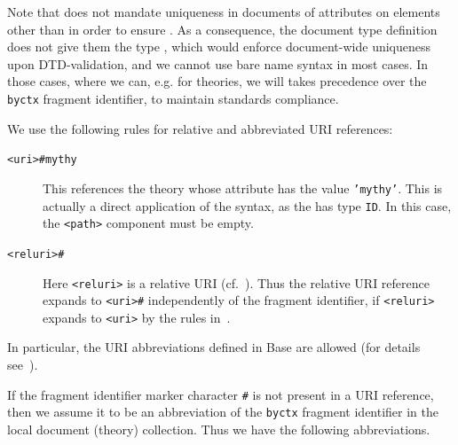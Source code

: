 Note that {\omdoc} does not mandate uniqueness in {\omdoc} documents of {}
attributes on elements other than {} in order to ensure
{}. As a consequence, the {\omdoc} document type definition does
not give them the type {}, which would enforce document-wide uniqueness upon
DTD-validation, and we cannot use {\xpointer} bare name syntax in most cases. In those
cases, where we can, e.g. for theories, we will {\xpointer} takes precedence over the
{\tt{byctx}} fragment identifier, to maintain {\xml} standards compliance.

We use the following rules for relative and abbreviated  URI references:
\begin{description}
\item[{\tt{<uri>\#mythy}}] This references the theory whose attribute
  {} has the value {\tt{'mythy'}}. This is actually a
  direct application of the {\xpointer} {} syntax, as the
  {} has type {\tt{ID}}. In this case, the {\tt{<path>}}
  component must be empty.
\item[{\tt{<reluri>\#<frag-id>}}] Here {\tt{<reluri>}} is a relative URI
  (cf.~\cite{BerFie:uri98}). Thus the relative URI reference expands to
  {\tt{<uri>\#<frag-id>}} independently of the fragment identifier, if
  {\tt{<reluri>}} expands to {\tt{<uri>}} by the rules in~\cite{BerFie:uri98}.
\end{description}
In particular, the URI abbreviations defined in {\xml} Base are allowed (for
details see~\cite{Marsh:xmlb01}).

If the fragment identifier marker character {\tt{\#}} is not present in a URI
reference, then we assume it to be an abbreviation of the {\tt{byctx}} fragment
identifier in the local document (theory) collection. Thus we have the following
abbreviations.

